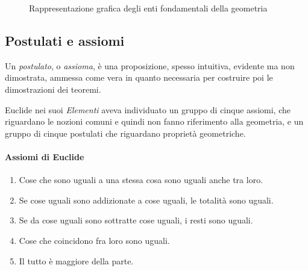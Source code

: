 \begin{inaccessibleblock}
 \begin{figure}[htb]
 \centering
 \caption{Rappresentazione grafica degli enti fondamentali della 
geometria}\label{fig:1.2}
\end{figure}
\end{inaccessibleblock}

\vspazio\ovalbox{\risolvi \ref{ese:1.32}}

\subsection{Postulati e assiomi}

Un \emph{postulato}, o \emph{assioma}, è una proposizione, spesso 
intuitiva, evidente ma non dimostrata, ammessa come vera in quanto 
necessaria per costruire poi le dimostrazioni dei teoremi.

Euclide nei suoi \emph{Elementi} aveva individuato un gruppo di 
cinque assiomi, che riguardano le nozioni comuni e quindi non fanno 
riferimento alla geometria, e un gruppo di cinque postulati che 
riguardano proprietà geometriche.

\paragraph{Assiomi di Euclide}
\begin{enumerate}[label=\Roman{*}.]
\item Cose che sono uguali a una stessa cosa sono uguali anche tra 
loro.
\item Se cose uguali sono addizionate a cose uguali, le totalità sono 
uguali.
\item Se da cose uguali sono sottratte cose uguali, i resti sono 
uguali.
\item Cose che coincidono fra loro sono uguali.
\item Il tutto è maggiore della parte.
\end{enumerate}

